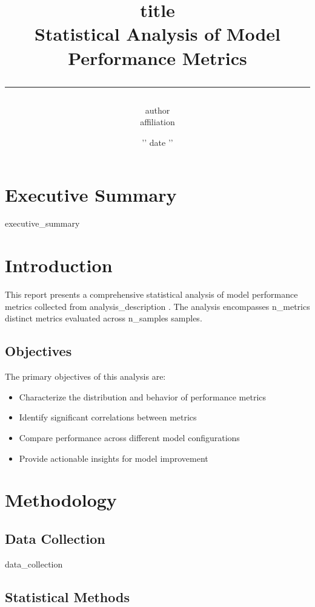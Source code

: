 \documentclass[11pt,a4paper]{article}
\title{
    \vspace{-2cm}
    {\Huge\bfseries\color{primarycolor} {{ title }}}\\
    \vspace{0.5cm}
    {\large Statistical Analysis of Model Performance Metrics}\\
    \vspace{0.5cm}
    \rule{\textwidth}{0.4pt}
}
\author{
    {{ author }}\\
    \small {{ affiliation }}
}
\date{{ '{' }}{{ date }}{{ '}' }}
\begin{document}
\maketitle
\thispagestyle{empty}

\section*{Executive Summary}

{{ executive_summary }}

\newpage
\tableofcontents
\newpage

\section{Introduction}

This report presents a comprehensive statistical analysis of model performance metrics collected from {{ analysis_description }}. The analysis encompasses {{ n_metrics }} distinct metrics evaluated across {{ n_samples }} samples.

\subsection{Objectives}

The primary objectives of this analysis are:
\begin{itemize}
    \item Characterize the distribution and behavior of performance metrics
    \item Identify significant correlations between metrics
    \item Compare performance across different model configurations
    \item Provide actionable insights for model improvement
\end{itemize}

\section{Methodology}

\subsection{Data Collection}

{{ data_collection }}

\subsection{Statistical Methods}
\end{document}

